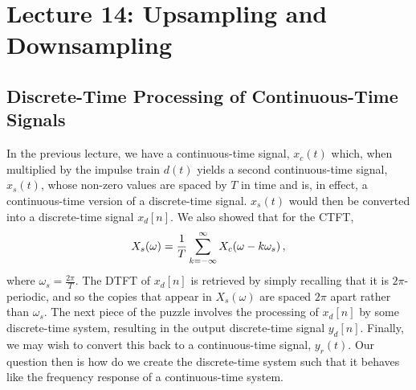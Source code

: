 \section{Lecture 14: Upsampling and Downsampling}

\subsection{Discrete-Time Processing of Continuous-Time Signals}
%
In the previous lecture, we have a continuous-time signal, $x_c(t)$ which, when
multiplied by the impulse train $d(t)$ yields a second continuous-time signal,
$x_s(t)$, whose non-zero values are spaced by $T$ in time and is, in effect,
a continuous-time version of a discrete-time signal. $x_s(t)$ would then be
converted into a discrete-time signal $x_d[n]$. We also showed that for the CTFT,
%
\begin{displaymath}
  X_s(\omega) = \frac{1}{T}\sum_{k=-\infty}^\infty X_c(\omega - k\omega_s) \,,
\end{displaymath}
%
where $\omega_s = \frac{2\pi}{T}$. The DTFT of $x_d[n]$ is retrieved by simply
recalling that it is $2\pi$-periodic, and so the copies that appear in
$X_s(\omega)$ are spaced $2\pi$ apart rather than $\omega_s$. The next piece of
the puzzle involves the processing of $x_d[n]$ by some discrete-time system,
resulting in the output discrete-time signal $y_d[n]$. Finally, we may wish to
convert this back to a continuous-time signal, $y_r(t)$. Our question then is
how do we create the discrete-time system such that it behaves like the
frequency response of a continuous-time system.\\

